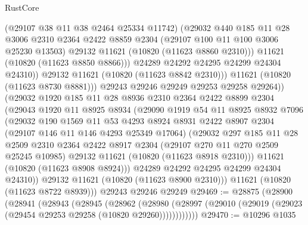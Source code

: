 \begin{lexlean}{RustCore}
\begin{coremodule}
                    (@29107 @38 @11 @38 @2464 @25334 @11742)
                    (@29032
                      @440
                      @185
                      @11
                      @28
                      @3006
                      @2310
                      @2364
                      @2422
                      @8859
                      @2304
                      (@29107 @100 @11 @100 @3006 @25230 @13503)
                      @29132
                      @11621
                      (@10820 (@11623 @8860 @2310)))
                    @11621
                    (@10820 (@11623 @8850 @8866)))
                  @24289
                  @24292
                  @24295
                  @24299
                  @24304
                  @24310))
              @29132
              @11621
              (@10820 (@11623 @8842 @2310)))
            @11621
            (@10820 (@11623 @8730 @8881)))
          @29243
          @29246
          @29249
          @29253
          @29258
          @29264))
      (@29032
        @1920
        @185
        @11
        @28
        @8936
        @2310
        @2364
        @2422
        @8899
        @2304
        (@29043
          @1920
          @11
          @8925
          @8934
          (@29090
            @1919
            @54
            @11
            @8925
            @8932
            @7096
            (@29032
              @190
              @1569
              @11
              @53
              @4293
              @8924
              @8931
              @2422
              @8907
              @2304
              (@29107 @146 @11 @146 @4293 @25349 @17064)
              (@29032
                @297
                @185
                @11
                @28
                @2509
                @2310
                @2364
                @2422
                @8917
                @2304
                (@29107 @270 @11 @270 @2509 @25245 @10985)
                @29132
                @11621
                (@10820 (@11623 @8918 @2310)))
              @11621
              (@10820 (@11623 @8908 @8924)))
            @24289
            @24292
            @24295
            @24299
            @24304
            @24310))
        @29132
        @11621
        (@10820 (@11623 @8900 @2310)))
      @11621
      (@10820 (@11623 @8722 @8939)))
    @29243
    @29246
    @29249
@29469 := @28875
    (@28900
      (@28941
        (@28943
          (@28945
            (@28962
              (@28980
                (@28997 (@29010 (@29019 (@29023 (@29454 @29253 @29258 (@10820 @29260))))))))))))
@29470 := @10296 @1035

\end{coremodule}
\end{lexlean}
